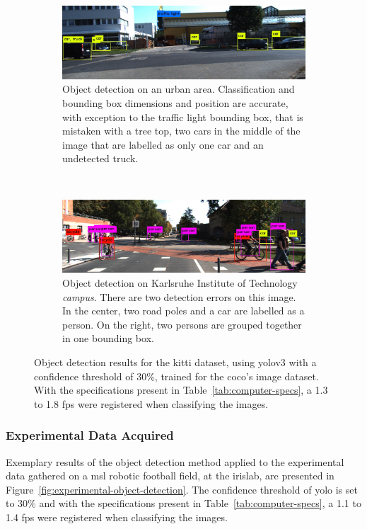 \begin{figure}[!ht]
	\centering
	\begin{subfigure}[c]{0.8\textwidth}
		\includegraphics[width=\textwidth]{img/object-detection/kitti-4.jpg}
		\caption{Object detection on an urban area. Classification and bounding box dimensions and position are accurate, with exception to the traffic light bounding box, that is mistaken with a tree top, two cars in the middle of the image that are labelled as only one car and an undetected truck.}
		\label{fig:kitti-yolo-3}
	\end{subfigure}
	\\ \vspace{4mm}
	\begin{subfigure}[c]{0.8\textwidth}
		\includegraphics[width=\textwidth]{img/object-detection/kitti-2.jpg}
		\caption{Object detection on Karlsruhe Institute of Technology \textit{campus}. There are two detection errors on this image. In the center, two road poles and a car are labelled as a person. On the right, two persons are grouped together in one bounding box.}
		\label{fig:kitti-yolo-2}
	\end{subfigure}
	\caption[Image object detection results on \acs{kitti} dataset.]{Object detection results for the \ac{kitti} dataset, using \ac{yolo}v3 with a confidence threshold of 30\%, trained for the \ac{coco}'s image dataset. With the specifications present in Table~\ref{tab:computer-specs}, a 1.3 to 1.8 \ac{fps} were registered when classifying the images.}
	\label{fig:kitti-object-detection}
\end{figure}


\subsubsection{Experimental Data Acquired}
Exemplary results of the object detection method applied to the experimental data gathered on a \ac{msl} robotic football field, at the \acf{irislab}, are presented in Figure~\ref{fig:experimental-object-detection}. The confidence threshold of \ac{yolo} is set to 30\% and with the specifications present in Table~\ref{tab:computer-specs}, a 1.1 to 1.4 \ac{fps} were registered when classifying the images.

